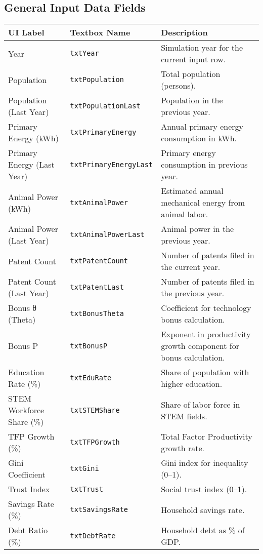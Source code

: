 \documentclass[12pt,a4paper]{article}
\begin{document}
\subsection{General Input Data Fields}
\begin{longtable}{p{4cm} p{4cm} p{7cm}}
\toprule
\textbf{UI Label} & \textbf{Textbox Name} & \textbf{Description} \\
\midrule
Year & \texttt{txtYear} & Simulation year for the current input row. \\
Population & \texttt{txtPopulation} & Total population (persons). \\
Population (Last Year) & \texttt{txtPopulationLast} & Population in the previous year. \\
Primary Energy (kWh) & \texttt{txtPrimaryEnergy} & Annual primary energy consumption in kWh. \\
Primary Energy (Last Year) & \texttt{txtPrimaryEnergyLast} & Primary energy consumption in previous year. \\
Animal Power (kWh) & \texttt{txtAnimalPower} & Estimated annual mechanical energy from animal labor. \\
Animal Power (Last Year) & \texttt{txtAnimalPowerLast} & Animal power in the previous year. \\
Patent Count & \texttt{txtPatentCount} & Number of patents filed in the current year. \\
Patent Count (Last Year) & \texttt{txtPatentLast} & Number of patents filed in the previous year. \\
Bonus θ (Theta) & \texttt{txtBonusTheta} & Coefficient for technology bonus calculation. \\
Bonus P & \texttt{txtBonusP} & Exponent in productivity growth component for bonus calculation. \\
Education Rate (\%) & \texttt{txtEduRate} & Share of population with higher education. \\
STEM Workforce Share (\%) & \texttt{txtSTEMShare} & Share of labor force in STEM fields. \\
TFP Growth (\%) & \texttt{txtTFPGrowth} & Total Factor Productivity growth rate. \\
Gini Coefficient & \texttt{txtGini} & Gini index for inequality (0–1). \\
Trust Index & \texttt{txtTrust} & Social trust index (0–1). \\
Savings Rate (\%) & \texttt{txtSavingsRate} & Household savings rate. \\
Debt Ratio (\%) & \texttt{txtDebtRate} & Household debt as \% of GDP. \\

\end{longtable}
\end{document}
